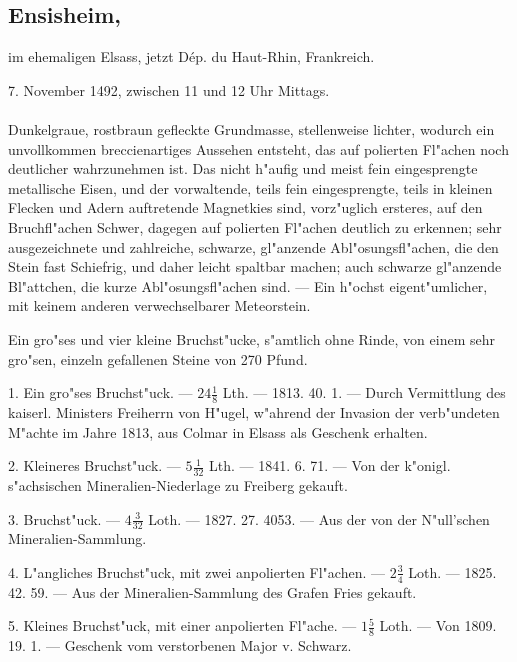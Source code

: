 \documentclass[a4paper, 11pt, oneside, polutonikogreek, german]{article}
\begin{document}
\subsection[Ensisheim.]{Ensisheim,}
\begin{center}
\small
im ehemaligen Elsass, jetzt Dép. du Haut-Rhin, Frankreich.

7. November 1492, zwischen 11 und 12 Uhr Mittags.
\end{center}
\paragraph{}
Dunkelgraue, rostbraun gefleckte Grundmasse, stellenweise lichter, wodurch ein unvollkommen breccienartiges Aussehen entsteht, das auf polierten Fl"achen noch deutlicher wahrzunehmen ist. Das nicht h"aufig und meist fein eingesprengte metallische Eisen, und der vorwaltende, teils fein eingesprengte, teils in kleinen Flecken und Adern auftretende Magnetkies sind, vorz"uglich ersteres, auf den Bruchfl"achen Schwer, dagegen auf polierten Fl"achen deutlich zu erkennen; sehr ausgezeichnete und zahlreiche, schwarze, gl"anzende Abl"osungsfl"achen, die den Stein fast Schiefrig, und daher leicht spaltbar machen; auch schwarze gl"anzende Bl"attchen‚ die kurze Abl"osungsfl"achen sind. --- Ein h"ochst eigent"umlicher, mit keinem anderen verwechselbarer Meteorstein.

Ein gro"ses und vier kleine Bruchst"ucke, s"amtlich ohne Rinde, von einem sehr gro"sen, einzeln gefallenen Steine von 270 Pfund.

1. Ein gro"ses Bruchst"uck. --- $24\frac{1}{8}$ Lth. --- 1813. 40. 1. --- Durch Vermittlung des kaiserl. Ministers Freiherrn von H"ugel, w"ahrend der Invasion der verb"undeten M"achte im Jahre 1813, aus Colmar in Elsass als Geschenk erhalten.

2. Kleineres Bruchst"uck. --- $5\frac{1}{32}$ Lth. --- 1841. 6. 71. --- Von der k"onigl. s"achsischen Mineralien-Niederlage zu Freiberg gekauft.

3. Bruchst"uck. --- $4\frac{3}{32}$ Loth. --- 1827. 27. 4053.
--- Aus der von der N"ull’schen Mineralien-Sammlung.

4. L"angliches Bruchst"uck, mit zwei anpolierten Fl"achen. --- $2\frac{3}{4}$ Loth. --- 1825. 42. 59. --- Aus der Mineralien-Sammlung des Grafen Fries gekauft.

5. Kleines Bruchst"uck, mit einer anpolierten Fl"ache. --- $1\frac{5}{8}$ Loth. --- Von 1809. 19. 1. --- Geschenk vom verstorbenen Major v. Schwarz.
\end{document}
